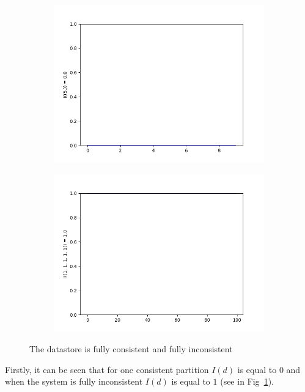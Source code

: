 \documentclass[a4paper,14pt]{llncs}
\begin{document}
\begin{figure}[p]
\begin{subfigure}{0.5\linewidth}
\centering\includegraphics[scale=0.4]{images/1-consistent-partition.png}\hfill
\end{subfigure}
\begin{subfigure}{0.5\linewidth}
\centering\includegraphics[scale=0.4]{images/1-1-1-1-1-consistent-partitions-probability.png}
\end{subfigure}
\caption{The datastore is fully consistent and fully inconsistent}\label{pic:fully}
\end{figure}
%
Firstly, it can be seen that for one consistent partition $I(d)$ is equal to $0$ and when the system is fully inconsistent $I(d)$ is equal to $1$ (see in Fig~\ref{pic:fully}).
\end{document}
